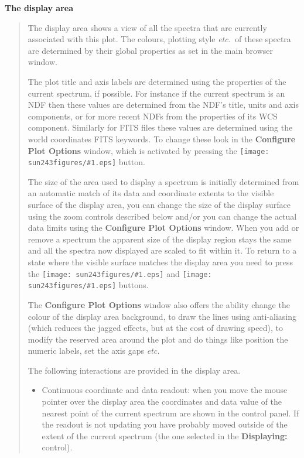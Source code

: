 \documentclass[twoside,11pt]{article}
\newcommand{\htmladdimg}[1]{}
\newcommand{\latexhtml}[2]{#1}
\renewcommand{\_}{\texttt{\symbol{95}}}
\newcommand{\inline}[1]
        {\latexhtml{\texttt{[image: sun243\_figures/\#1.eps]}}
        {\htmladdimg[align=center]{#1.gif}}}
\newcommand{\labelitem}[1]{\textbf{#1}}
\newcommand{\etc}{\textit{etc.}}
\newcommand{\subheading}[1]{\textbf{\large{#1}}}
\begin{document}
\subheading{The display area}
\begin{quote}
 The display area shows a view of all the spectra that are currently
 associated with this plot. The colours, plotting style \etc\ of these
 spectra are determined by their global properties as set in the main
 browser window.

 The plot title and axis labels are determined using the properties of the
 current spectrum, if possible. For instance if the current spectrum is an NDF
 then these values are determined from the NDF's title, units and axis
 components, or for more recent NDFs from the properties of its WCS
 component. Similarly for FITS files these values are determined using the
 world coordinates FITS keywords. To change these look in the
 \labelitem{Configure Plot Options} window, which is activated by pressing the
 \inline{config} button.

 The size of the area used to display a spectrum is initially determined from
 an automatic match of its data and coordinate extents to the visible surface
 of the display area, you can change the size of the display surface using the
 zoom controls described below and/or you can change the actual data limits
 using the \labelitem{Configure Plot Options} window. When you add or remove a
 spectrum the apparent size of the display region stays the same and all the
 spectra now displayed are scaled to fit within it. To return to a state where
 the visible surface matches the display area you need to press the
 \inline{fitwidth} and \inline{fitheight} buttons.

 The \labelitem{Configure Plot Options} window also offers the ability change
 the colour of the display area background, to draw the lines using
 anti-aliasing (which reduces the jagged effects, but at the cost of drawing
 speed), to modify the reserved area around the plot and do things like
 position the numeric labels, set the axis gaps \etc\

 The following interactions are provided in the display area.
 \begin{itemize}

  \item Continuous coordinate and data readout: when you move the mouse
  pointer over the display area the coordinates and data value of the nearest
  point of the current spectrum are shown in the control panel.  If the
  readout is not updating you have probably moved outside of the extent of the
  current spectrum (the one selected in the \labelitem{Displaying:} control).


\end{itemize}
\end{quote}
\end{document}
